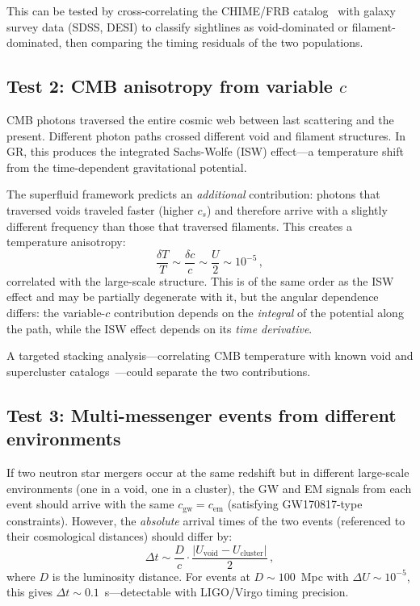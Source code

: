 \documentclass[12pt, a4paper]{article}
\begin{document}
This can be tested by cross-correlating the CHIME/FRB
catalog~\cite{chime_2021} with galaxy survey data
(SDSS, DESI) to classify sightlines as
void-dominated or filament-dominated, then comparing
the timing residuals of the two populations.

\subsection{Test 2: CMB anisotropy from variable \texorpdfstring{$c$}{c}}

CMB photons traversed the entire cosmic web between
last scattering and the present. Different photon
paths crossed different void and filament structures.
In GR, this produces the integrated Sachs-Wolfe (ISW)
effect---a temperature shift from the time-dependent
gravitational potential.

The superfluid framework predicts an
\emph{additional} contribution: photons that
traversed voids traveled faster (higher $c_s$) and
therefore arrive with a slightly different frequency
than those that traversed filaments. This creates a
temperature anisotropy:
\begin{equation}
    \frac{\delta T}{T} \sim
    \frac{\delta c}{c} \sim \frac{U}{2}
    \sim 10^{-5}\,,
\label{eq:dT_T}
\end{equation}
correlated with the large-scale structure. This is
of the same order as the ISW effect and may be
partially degenerate with it, but the angular
dependence differs: the variable-$c$ contribution
depends on the \emph{integral} of the potential
along the path, while the ISW effect depends on its
\emph{time derivative}.

A targeted stacking analysis---correlating CMB
temperature with known void and supercluster
catalogs~\cite{sutter_2012}---could separate the two
contributions.

\subsection{Test 3: Multi-messenger events from
different environments}

If two neutron star mergers occur at the same
redshift but in different large-scale environments
(one in a void, one in a cluster), the GW and EM
signals from each event should arrive with the same
$c_{\mathrm{gw}} = c_{\mathrm{em}}$ (satisfying
GW170817-type constraints). However, the
\emph{absolute} arrival times of the two events
(referenced to their cosmological distances) should
differ by:
\begin{equation}
    \Delta t \sim \frac{D}{c}
    \cdot \frac{|U_{\mathrm{void}}
    - U_{\mathrm{cluster}}|}{2}\,,
\label{eq:dt_mm}
\end{equation}
where $D$ is the luminosity distance. For events at
$D \sim 100$~Mpc with $\Delta U \sim 10^{-5}$, this
gives $\Delta t \sim 0.1$~s---detectable with
LIGO/Virgo timing precision.
\end{document}
